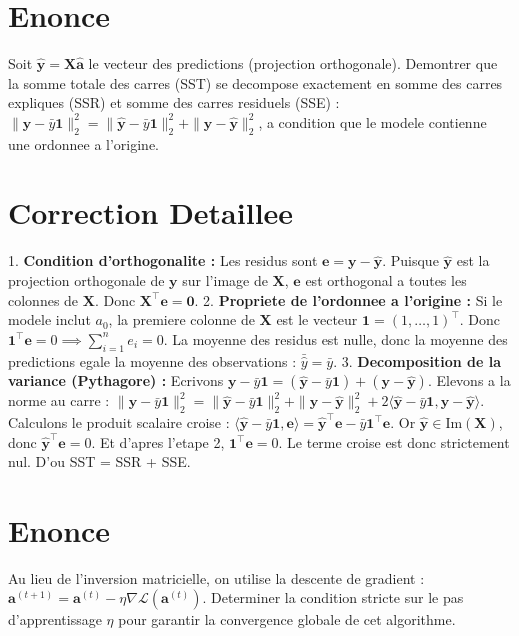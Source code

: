 \documentclass[11pt,a4paper]{report}
\begin{document}
\section{Enonce}
Soit $\hat{\mathbf{y}} = \mathbf{X}\hat{\mathbf{a}}$ le vecteur des predictions (projection orthogonale).
Demontrer que la somme totale des carres (SST) se decompose exactement en somme des carres expliques (SSR) et somme des carres residuels (SSE) : $\|\mathbf{y} - \bar{y}\mathbf{1}\|_2^2 = \|\hat{\mathbf{y}} - \bar{y}\mathbf{1}\|_2^2 + \|\mathbf{y} - \hat{\mathbf{y}}\|_2^2$, a condition que le modele contienne une ordonnee a l'origine.

\section{Correction Detaillee}
1. \textbf{Condition d'orthogonalite :}
   Les residus sont $\mathbf{e} = \mathbf{y} - \hat{\mathbf{y}}$.
   Puisque $\hat{\mathbf{y}}$ est la projection orthogonale de $\mathbf{y}$ sur l'image de $\mathbf{X}$, $\mathbf{e}$ est orthogonal a toutes les colonnes de $\mathbf{X}$.
   Donc $\mathbf{X}^\top \mathbf{e} = \mathbf{0}$.
2. \textbf{Propriete de l'ordonnee a l'origine :}
   Si le modele inclut $a_0$, la premiere colonne de $\mathbf{X}$ est le vecteur $\mathbf{1} = (1, \dots, 1)^\top$.
   Donc $\mathbf{1}^\top \mathbf{e} = 0 \implies \sum_{i=1}^n e_i = 0$.
   La moyenne des residus est nulle, donc la moyenne des predictions egale la moyenne des observations : $\bar{\hat{y}} = \bar{y}$.
3. \textbf{Decomposition de la variance (Pythagore) :}
   Ecrivons $\mathbf{y} - \bar{y}\mathbf{1} = (\hat{\mathbf{y}} - \bar{y}\mathbf{1}) + (\mathbf{y} - \hat{\mathbf{y}})$.
   Elevons a la norme au carre :
   $\|\mathbf{y} - \bar{y}\mathbf{1}\|_2^2 = \|\hat{\mathbf{y}} - \bar{y}\mathbf{1}\|_2^2 + \|\mathbf{y} - \hat{\mathbf{y}}\|_2^2 + 2\langle \hat{\mathbf{y}} - \bar{y}\mathbf{1}, \mathbf{y} - \hat{\mathbf{y}} \rangle$.
   Calculons le produit scalaire croise :
   $\langle \hat{\mathbf{y}} - \bar{y}\mathbf{1}, \mathbf{e} \rangle = \hat{\mathbf{y}}^\top \mathbf{e} - \bar{y}\mathbf{1}^\top \mathbf{e}$.
   Or $\hat{\mathbf{y}} \in \text{Im}(\mathbf{X})$, donc $\hat{\mathbf{y}}^\top \mathbf{e} = 0$.
   Et d'apres l'etape 2, $\mathbf{1}^\top \mathbf{e} = 0$.
   Le terme croise est donc strictement nul.
   D'ou SST = SSR + SSE.

\section{Enonce}
Au lieu de l'inversion matricielle, on utilise la descente de gradient : $\mathbf{a}^{(t+1)} = \mathbf{a}^{(t)} - \eta \nabla \mathcal{L}(\mathbf{a}^{(t)})$.
Determiner la condition stricte sur le pas d'apprentissage $\eta$ pour garantir la convergence globale de cet algorithme.
\end{document}
